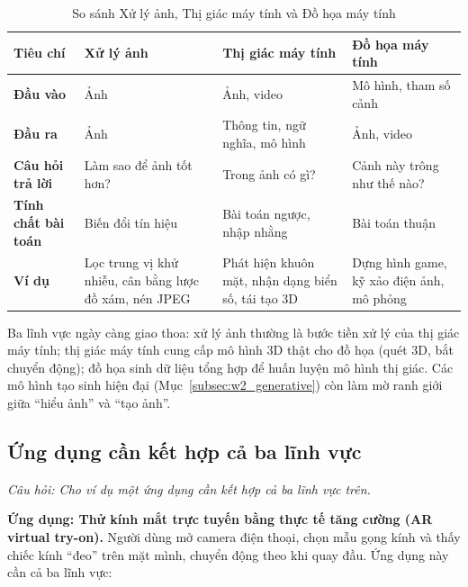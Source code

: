 \begin{table}[ht]
\centering
\small
\caption{So sánh Xử lý ảnh, Thị giác máy tính và Đồ họa máy tính}
\label{tab:w1_three_fields}
\renewcommand{\arraystretch}{1.3}
\begin{tabularx}{\textwidth}{|p{2.3cm}|X|X|X|}
\hline
\textbf{Tiêu chí} & \textbf{Xử lý ảnh} & \textbf{Thị giác máy tính} & \textbf{Đồ họa máy tính} \\
\hline
\textbf{Đầu vào} & Ảnh & Ảnh, video & Mô hình, tham số cảnh \\
\hline
\textbf{Đầu ra} & Ảnh & Thông tin, ngữ nghĩa, mô hình & Ảnh, video \\
\hline
\textbf{Câu hỏi trả lời} & Làm sao để ảnh tốt hơn? & Trong ảnh có gì? & Cảnh này trông như thế nào? \\
\hline
\textbf{Tính chất bài toán} & Biến đổi tín hiệu & Bài toán ngược, nhập nhằng & Bài toán thuận \\
\hline
\textbf{Ví dụ} & Lọc trung vị khử nhiễu, cân bằng lược đồ xám, nén JPEG & Phát hiện khuôn mặt, nhận dạng biển số, tái tạo 3D & Dựng hình game, kỹ xảo điện ảnh, mô phỏng \\
\hline
\end{tabularx}
\end{table}

Ba lĩnh vực ngày càng giao thoa: xử lý ảnh thường là bước tiền xử lý của thị giác máy tính; thị giác máy tính cung cấp mô hình 3D thật cho đồ họa (quét 3D, bắt chuyển động); đồ họa sinh dữ liệu tổng hợp để huấn luyện mô hình thị giác. Các mô hình tạo sinh hiện đại (Mục~\ref{subsec:w2_generative}) còn làm mờ ranh giới giữa ``hiểu ảnh'' và ``tạo ảnh''.

\subsection{Ứng dụng cần kết hợp cả ba lĩnh vực}
\label{subsec:w1_three_fields_app}

\textit{Câu hỏi: Cho ví dụ một ứng dụng cần kết hợp cả ba lĩnh vực trên.}

\textbf{Ứng dụng: Thử kính mắt trực tuyến bằng thực tế tăng cường (AR virtual try-on).} Người dùng mở camera điện thoại, chọn mẫu gọng kính và thấy chiếc kính ``đeo'' trên mặt mình, chuyển động theo khi quay đầu. Ứng dụng này cần cả ba lĩnh vực:

